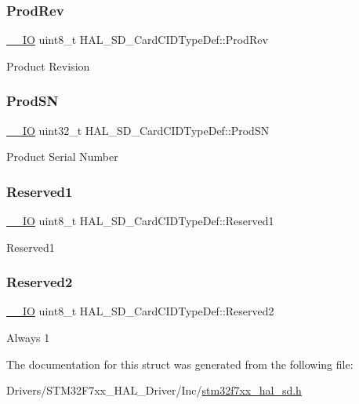 \subsubsection{\texorpdfstring{ProdRev}{ProdRev}}
{\footnotesize\ttfamily \mbox{\hyperlink{core__sc300_8h_aec43007d9998a0a0e01faede4133d6be}{\+\_\+\+\_\+\+IO}} uint8\+\_\+t H\+A\+L\+\_\+\+S\+D\+\_\+\+Card\+C\+I\+D\+Type\+Def\+::\+Prod\+Rev}

Product Revision \mbox{\label{struct_h_a_l___s_d___card_c_i_d_type_def_ac41a0112d5ee8df09f804e22b1896a81}} 
\subsubsection{\texorpdfstring{ProdSN}{ProdSN}}
{\footnotesize\ttfamily \mbox{\hyperlink{core__sc300_8h_aec43007d9998a0a0e01faede4133d6be}{\+\_\+\+\_\+\+IO}} uint32\+\_\+t H\+A\+L\+\_\+\+S\+D\+\_\+\+Card\+C\+I\+D\+Type\+Def\+::\+Prod\+SN}

Product Serial Number \mbox{\label{struct_h_a_l___s_d___card_c_i_d_type_def_a1048105437a4744cb6ac946425c51624}} 
\subsubsection{\texorpdfstring{Reserved1}{Reserved1}}
{\footnotesize\ttfamily \mbox{\hyperlink{core__sc300_8h_aec43007d9998a0a0e01faede4133d6be}{\+\_\+\+\_\+\+IO}} uint8\+\_\+t H\+A\+L\+\_\+\+S\+D\+\_\+\+Card\+C\+I\+D\+Type\+Def\+::\+Reserved1}

Reserved1 \mbox{\label{struct_h_a_l___s_d___card_c_i_d_type_def_a7d03d483cd6efcdf1c4dd3089ee0fb10}} 
\subsubsection{\texorpdfstring{Reserved2}{Reserved2}}
{\footnotesize\ttfamily \mbox{\hyperlink{core__sc300_8h_aec43007d9998a0a0e01faede4133d6be}{\+\_\+\+\_\+\+IO}} uint8\+\_\+t H\+A\+L\+\_\+\+S\+D\+\_\+\+Card\+C\+I\+D\+Type\+Def\+::\+Reserved2}

Always 1 

The documentation for this struct was generated from the following file\+:\begin{DoxyCompactItemize}
\item 
Drivers/\+S\+T\+M32\+F7xx\+\_\+\+H\+A\+L\+\_\+\+Driver/\+Inc/\mbox{\hyperlink{stm32f7xx__hal__sd_8h}{stm32f7xx\+\_\+hal\+\_\+sd.\+h}}\end{DoxyCompactItemize}
